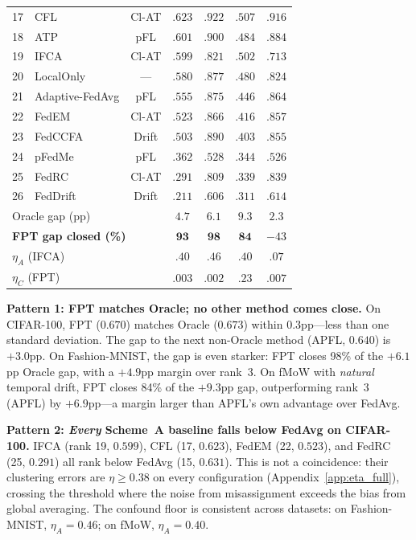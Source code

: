 \documentclass[11pt]{article}
\begin{document}
\begin{table}[t]
\begin{tabular}{rlccccc}
\rowcolor{red!8}
17 & CFL & Cl-AT & $.623$ & $.922$ & $.507$ & $.916$ \\
18 & ATP & pFL & $.601$ & $.900$ & $.484$ & $.884$ \\
\rowcolor{red!8}
19 & IFCA & Cl-AT & $.599$ & $.821$ & $.502$ & $.713$ \\
20 & LocalOnly & --- & $.580$ & $.877$ & $.480$ & $.824$ \\
21 & Adaptive-FedAvg & pFL & $.555$ & $.875$ & $.446$ & $.864$ \\
\rowcolor{red!8}
22 & FedEM & Cl-AT & $.523$ & $.866$ & $.416$ & $.857$ \\
23 & FedCCFA & Drift & $.503$ & $.890$ & $.403$ & $.855$ \\
24 & pFedMe & pFL & $.362$ & $.528$ & $.344$ & $.526$ \\
\rowcolor{red!8}
25 & FedRC & Cl-AT & $.291$ & $.809$ & $.339$ & $.839$ \\
26 & FedDrift & Drift & $.211$ & $.606$ & $.311$ & $.614$ \\
\midrule
\multicolumn{3}{l}{\small Oracle gap (pp)} & $4.7$ & $6.1$ & $9.3$ & $2.3$ \\
\multicolumn{3}{l}{\small \textbf{FPT gap closed (\%)}} & $\mathbf{93}$ & $\mathbf{98}$ & $\mathbf{84}$ & $-43$ \\
\multicolumn{3}{l}{\small $\eta_A$ (IFCA)} & $.40$ & $.46$ & $.40$ & $.07$ \\
\multicolumn{3}{l}{\small $\eta_C$ (FPT)} & $.003$ & $.002$ & $.23$ & $.007$ \\
\bottomrule
\end{tabular}
\end{table}

\textbf{Pattern 1: FPT matches Oracle; no other method comes close.}
On CIFAR-100, FPT ($0.670$) matches Oracle ($0.673$) within $0.3$pp---less than one standard deviation.
The gap to the next non-Oracle method (APFL, $0.640$) is $+3.0$pp.
On Fashion-MNIST, the gap is even starker: FPT closes 98\% of the $+6.1$pp Oracle gap, with a $+4.9$pp margin over rank~3.
On fMoW with \emph{natural} temporal drift, FPT closes 84\% of the $+9.3$pp gap, outperforming rank~3 (APFL) by $+6.9$pp---a margin larger than APFL's own advantage over FedAvg.

\textbf{Pattern 2: \emph{Every} Scheme~A baseline falls below FedAvg on CIFAR-100.}
IFCA (rank 19, $0.599$), CFL (17, $0.623$), FedEM (22, $0.523$), and FedRC (25, $0.291$) all rank below FedAvg (15, $0.631$).
This is not a coincidence: their clustering errors are $\eta \ge 0.38$ on every configuration (Appendix~\ref{app:eta_full}), crossing the threshold where the noise from misassignment exceeds the bias from global averaging.
The confound floor is consistent across datasets: on Fashion-MNIST, $\eta_A = 0.46$; on fMoW, $\eta_A = 0.40$.
\end{document}
